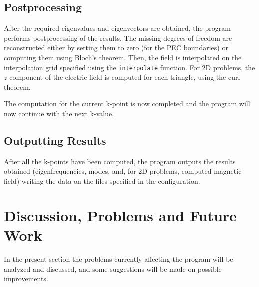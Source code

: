 \documentclass[11pt,a4paper,oneside]{article}
\begin{document}
\subsection{Postprocessing}
After the required eigenvalues and eigenvectors are obtained, the program performs postprocessing of the results. The missing degrees of freedom are reconstructed either by setting them to zero (for the PEC boundaries) or computing them using Bloch's theorem. Then, the field is interpolated on the interpolation grid specified using the {\tt interpolate} function. For 2D problems, the $z$ component of the electric field is computed for each triangle, using the curl theorem.

The computation for the current k-point is now completed and the program will now continue with the next k-value.

\subsection{Outputting Results}
After all the k-points have been computed, the program outputs the results obtained (eigenfrequencies, modes, and, for 2D problems, computed magnetic field) writing the data on the files specified in the configuration.

\section{Discussion, Problems and Future Work}
In the present section the problems currently affecting the program will be analyzed and discussed, and some suggestions will be made on possible improvements.
\end{document}
